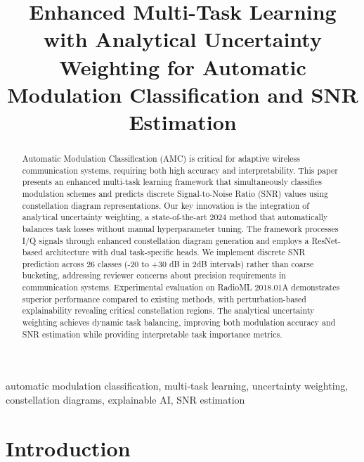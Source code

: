 \documentclass[conference]{IEEEtran}
\begin{document}
\title{Enhanced Multi-Task Learning with Analytical Uncertainty Weighting for Automatic Modulation Classification and SNR Estimation}

\author{
}

\maketitle

\begin{abstract}
Automatic Modulation Classification (AMC) is critical for adaptive wireless communication systems, requiring both high accuracy and interpretability. This paper presents an enhanced multi-task learning framework that simultaneously classifies modulation schemes and predicts discrete Signal-to-Noise Ratio (SNR) values using constellation diagram representations. Our key innovation is the integration of analytical uncertainty weighting, a state-of-the-art 2024 method that automatically balances task losses without manual hyperparameter tuning. The framework processes I/Q signals through enhanced constellation diagram generation and employs a ResNet-based architecture with dual task-specific heads. We implement discrete SNR prediction across 26 classes (-20 to +30 dB in 2dB intervals) rather than coarse bucketing, addressing reviewer concerns about precision requirements in communication systems. Experimental evaluation on RadioML 2018.01A demonstrates superior performance compared to existing methods, with perturbation-based explainability revealing critical constellation regions. The analytical uncertainty weighting achieves dynamic task balancing, improving both modulation accuracy and SNR estimation while providing interpretable task importance metrics.
\end{abstract}

\begin{IEEEkeywords}
automatic modulation classification, multi-task learning, uncertainty weighting, constellation diagrams, explainable AI, SNR estimation
\end{IEEEkeywords}

\section{Introduction}
\end{document}
